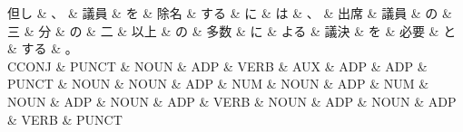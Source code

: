 \documentclass[tikz,border=5pt]{standalone}
\begin{document}
\normalsize
\begin{dependency}[edge unit distance=10.0pt]
    \begin{deptext}[column sep=1em]
        但し \& 、 \& 議員 \& を \& 除名 \& する \& に \& は \& 、 \& 出席 \& 議員 \& の \& 三 \& 分 \& の \& 二 \& 以上 \& の \& 多数 \& に \& よる \& 議決 \& を \& 必要 \& と \& する \& 。\\
        CCONJ \& PUNCT \& NOUN \& ADP \& VERB \& AUX \& ADP \& ADP \& PUNCT \& NOUN \& NOUN \& ADP \& NUM \& NOUN \& ADP \& NUM \& NOUN \& ADP \& NOUN \& ADP \& VERB \& NOUN \& ADP \& NOUN \& ADP \& VERB \& PUNCT\\
    \end{deptext}
\end{dependency}
\end{document}
